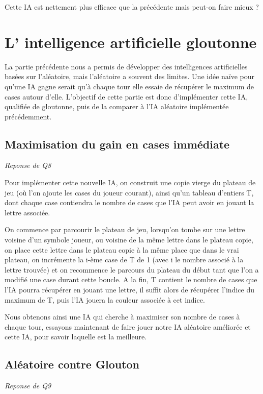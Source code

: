 \documentclass[a4paper,11pt]{article}
\begin{document}
Cette IA est nettement plus efficace que la précédente mais peut-on faire mieux ?


\section{L' intelligence artificielle gloutonne}

La partie précédente nous a permis de développer des intelligences artificielles
basées sur l'aléatoire, mais l'aléatoire a souvent des limites. Une idée naïve pour
qu'une IA gagne serait qu'à chaque tour elle essaie de récupérer le maximum de cases
autour d'elle. L'objectif de cette partie est donc d'implémenter cette IA, qualifiée 
de gloutonne, puis de la comparer à l'IA aléatoire implémentée précédemment.


\subsection{Maximisation du gain en cases immédiate}
\emph{Reponse de Q8}

Pour implémenter cette nouvelle IA, on construit une copie vierge du plateau de jeu (où l'on ajoute les cases du joueur courant),
ainsi qu'un tableau d'entiers T, dont chaque case contiendra le nombre de cases que l'IA peut
avoir en jouant la lettre associée. 

On commence par parcourir le plateau de jeu, lorsqu'on tombe sur une lettre voisine
d'un symbole joueur, ou voisine de la même lettre dans le plateau copie, on place cette
lettre dans le plateau copie à la même place que dans le vrai plateau, on incrémente
la i-ème case de T de 1 (avec i le nombre associé à la lettre trouvée) et on 
recommence le parcours du plateau du début tant que l'on a modifié une case durant cette boucle. A la fin, T contient le nombre de cases
que l'IA pourra récupérer en jouant une lettre, il suffit alors de récupérer l'indice
du maximum de T, puis l'IA jouera la couleur associée à cet indice. 

Nous obtenons ainsi une IA qui cherche à maximiser son nombre de cases à chaque tour,
essayons maintenant de faire jouer notre IA aléatoire améliorée et cette IA, pour
savoir laquelle est la meilleure.

\subsection{Aléatoire contre Glouton}
\emph{Reponse de Q9}
\end{document}
